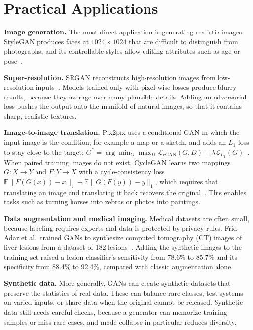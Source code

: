 \documentclass[conference]{IEEEtran}
\newcommand{\E}{\mathbb{E}}
\begin{document}
\section{Practical Applications}
\textbf{Image generation.} The most direct application is generating realistic images. StyleGAN produces faces at $1024\times1024$ that are difficult to distinguish from photographs, and its controllable styles allow editing attributes such as age or pose~\cite{karras2019}.

\textbf{Super-resolution.} SRGAN reconstructs high-resolution images from low-resolution inputs~\cite{ledig2017}. Models trained only with pixel-wise losses produce blurry results, because they average over many plausible details. Adding an adversarial loss pushes the output onto the manifold of natural images, so that it contains sharp, realistic textures.

\textbf{Image-to-image translation.} Pix2pix uses a conditional GAN in which the input image is the condition, for example a map or a sketch, and adds an $L_1$ loss to stay close to the target: $G^*=\arg\min_G\max_D\mathcal{L}_{\mathrm{cGAN}}(G,D)+\lambda\mathcal{L}_{L_1}(G)$~\cite{isola2017}. When paired training images do not exist, CycleGAN learns two mappings $G:X\to Y$ and $F:Y\to X$ with a cycle-consistency loss $\E\|F(G(x))-x\|_1+\E\|G(F(y))-y\|_1$, which requires that translating an image and translating it back recovers the original~\cite{zhu2017}. This enables tasks such as turning horses into zebras or photos into paintings.

\textbf{Data augmentation and medical imaging.} Medical datasets are often small, because labeling requires experts and data is protected by privacy rules. Frid-Adar et al.\ trained GANs to synthesize computed tomography (CT) images of liver lesions from a dataset of 182 lesions~\cite{fridadar2018}. Adding the synthetic images to the training set raised a lesion classifier's sensitivity from 78.6\% to 85.7\% and its specificity from 88.4\% to 92.4\%, compared with classic augmentation alone.

\textbf{Synthetic data.} More generally, GANs can create synthetic datasets that preserve the statistics of real data. These can balance rare classes, test systems on varied inputs, or share data when the original cannot be released. Synthetic data still needs careful checks, because a generator can memorize training samples or miss rare cases, and mode collapse in particular reduces diversity.
\end{document}
